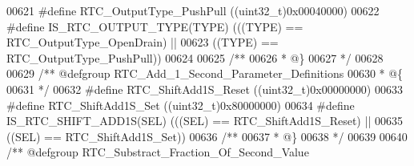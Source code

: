 \begin{DoxyCode}
00621 \textcolor{preprocessor}{#}\textcolor{preprocessor}{define} \textcolor{preprocessor}{RTC\_OutputType\_PushPull}            \textcolor{preprocessor}{(}\textcolor{preprocessor}{(}\textcolor{preprocessor}{uint32\_t}\textcolor{preprocessor}{)}0x00040000\textcolor{preprocessor}{)}
00622 \textcolor{preprocessor}{#}\textcolor{preprocessor}{define} \textcolor{preprocessor}{IS\_RTC\_OUTPUT\_TYPE}\textcolor{preprocessor}{(}\textcolor{preprocessor}{TYPE}\textcolor{preprocessor}{)} \textcolor{preprocessor}{(}\textcolor{preprocessor}{(}\textcolor{preprocessor}{(}\textcolor{preprocessor}{TYPE}\textcolor{preprocessor}{)} \textcolor{preprocessor}{==} RTC_OutputType_OpenDrain\textcolor{preprocessor}{)} \textcolor{preprocessor}{||}
00623                                   \textcolor{preprocessor}{(}\textcolor{preprocessor}{(}\textcolor{preprocessor}{TYPE}\textcolor{preprocessor}{)} \textcolor{preprocessor}{==} RTC_OutputType_PushPull\textcolor{preprocessor}{)}\textcolor{preprocessor}{)}
00624 
00625 \textcolor{comment}{/**}
00626 \textcolor{comment}{  * @\}}
00627 \textcolor{comment}{  */}
00628 
00629 \textcolor{comment}{/** @defgroup RTC\_Add\_1\_Second\_Parameter\_Definitions}
00630 \textcolor{comment}{  * @\{}
00631 \textcolor{comment}{  */}
00632 \textcolor{preprocessor}{#}\textcolor{preprocessor}{define} \textcolor{preprocessor}{RTC\_ShiftAdd1S\_Reset}      \textcolor{preprocessor}{(}\textcolor{preprocessor}{(}\textcolor{preprocessor}{uint32\_t}\textcolor{preprocessor}{)}0x00000000\textcolor{preprocessor}{)}
00633 \textcolor{preprocessor}{#}\textcolor{preprocessor}{define} \textcolor{preprocessor}{RTC\_ShiftAdd1S\_Set}        \textcolor{preprocessor}{(}\textcolor{preprocessor}{(}\textcolor{preprocessor}{uint32\_t}\textcolor{preprocessor}{)}0x80000000\textcolor{preprocessor}{)}
00634 \textcolor{preprocessor}{#}\textcolor{preprocessor}{define} \textcolor{preprocessor}{IS\_RTC\_SHIFT\_ADD1S}\textcolor{preprocessor}{(}\textcolor{preprocessor}{SEL}\textcolor{preprocessor}{)} \textcolor{preprocessor}{(}\textcolor{preprocessor}{(}\textcolor{preprocessor}{(}\textcolor{preprocessor}{SEL}\textcolor{preprocessor}{)} \textcolor{preprocessor}{==} RTC_ShiftAdd1S_Reset\textcolor{preprocessor}{)} \textcolor{preprocessor}{||}
00635                                  \textcolor{preprocessor}{(}\textcolor{preprocessor}{(}\textcolor{preprocessor}{SEL}\textcolor{preprocessor}{)} \textcolor{preprocessor}{==} RTC_ShiftAdd1S_Set\textcolor{preprocessor}{)}\textcolor{preprocessor}{)}
00636 \textcolor{comment}{/**}
00637 \textcolor{comment}{  * @\}}
00638 \textcolor{comment}{  */}
00639 
00640 \textcolor{comment}{/** @defgroup RTC\_Substract\_Fraction\_Of\_Second\_Value}

\end{DoxyCode}
